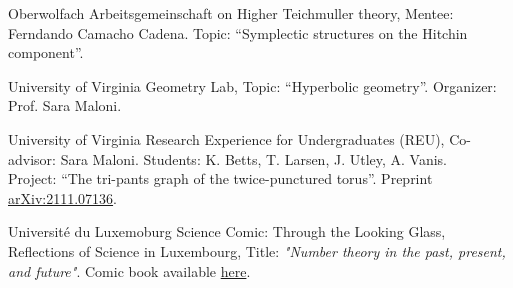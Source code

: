 {Oberwolfach}
{Arbeitsgemeinschaft on Higher Teichmuller theory,}
{Mentee: Ferndando Camacho Cadena. Topic: ``Symplectic structures on the Hitchin component''.}

\vspace{0.5em}

{University of Virginia}
{Geometry Lab,}
{Topic: ``Hyperbolic geometry''. Organizer: Prof. Sara Maloni.}

\vspace{0.5em}

{University of Virginia}
{Research Experience for Undergraduates (REU),}
{Co-advisor: Sara Maloni. Students: K. Betts, T. Larsen, J. Utley, A. Vanis. \\Project: ``The tri-pants graph of the twice-punctured torus''. Preprint \href{https://arxiv.org/abs/2111.07136}{arXiv:2111.07136}.}

\vspace{0.5em}

{Universit{\'e} du Luxemoburg}
{Science Comic: Through the Looking Glass, \\Reflections of Science in Luxembourg,}
{Title: \emph{"Number theory in the past, present, and future"}. Comic book available \href{https://www.yumpu.com/en/document/view/62710549/science-comic-through-the-looking-glass-reflections-of-science-in-luxembourg}{here}.}
